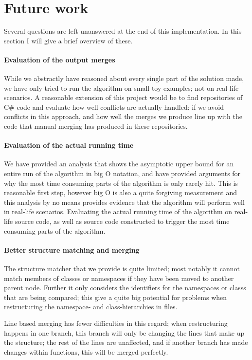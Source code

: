 \documentclass[11pt]{article}
\begin{document}
\clearpage
\section{Future work}
Several questions are left unanswered at the end of this implementation. In this section I will give a brief overview of these.

\paragraph{Evaluation of the output merges} While we abstractly have reasoned about every single part of the solution made, we have only tried to run the algorithm on small toy examples; not on real-life scenarios. A reasonable extension of this project would be to find repositories of C\# code and evaluate how well conflicts are actually handled: if we avoid conflicts in this approach, and how well the merges we produce line up with the code that manual merging has produced in these repositories.

\paragraph{Evaluation of the actual running time} We have provided an analysis that shows the asymptotic upper bound for an entire run of the algorithm in big O notation, and have provided arguments for why the most time consuming parts of the algorithm is only rarely hit. This is reasonable first step, however big O is also a quite forgiving measurement and this analysis by no means provides evidence that the algorithm will perform well in real-life scenarios. Evaluating the actual running time of the algorithm on real-life source code, as well as source code constructed to trigger the most time consuming parts of the algorithm.

\paragraph{Better structure matching and merging} The structure matcher that we provide is quite limited; most notably it cannot match members of classes or namespaces if they have been moved to another parent node. Further it only considers the identifiers for the namespaces or classs that are being compared; this give a quite big potential for problems when restructuring the namespace- and class-hierarchies in files.

Line based merging has fewer difficulties in this regard; when restructuring happens in one branch, this branch will only be changing the lines that make up the structure; the rest of the lines are unaffected, and if another branch has made changes within functions, this will be merged perfectly.
\end{document}
